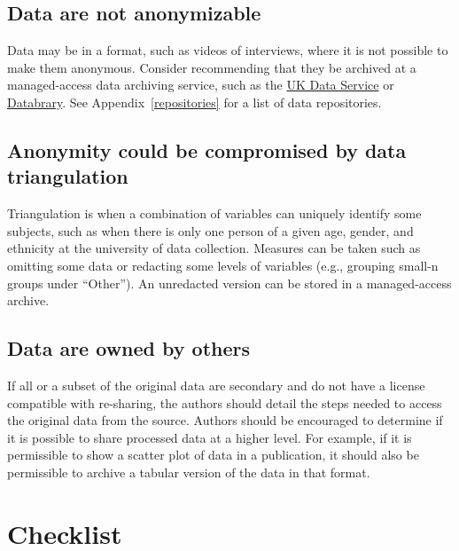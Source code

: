 \documentclass[
  oneside]{book}
\begin{document}
\hypertarget{data-are-not-anonymizable}{%
\subsection{Data are not anonymizable}\label{data-are-not-anonymizable}}

Data may be in a format, such as videos of interviews, where it is not possible to make them anonymous. Consider recommending that they be archived at a managed-access data archiving service, such as the \href{https://ukdataservice.ac.uk/deposit-data/}{UK Data Service} or \href{https://databrary.org/about/agreement.html}{Databrary}. See Appendix~\ref{repositories} for a list of data repositories.

\hypertarget{anonymity-could-be-compromised-by-data-triangulation}{%
\subsection{Anonymity could be compromised by data triangulation}\label{anonymity-could-be-compromised-by-data-triangulation}}

Triangulation is when a combination of variables can uniquely identify some subjects, such as when there is only one person of a given age, gender, and ethnicity at the university of data collection. Measures can be taken such as omitting some data or redacting some levels of variables (e.g., grouping small-n groups under ``Other''). An unredacted version can be stored in a managed-access archive.

\hypertarget{data-are-owned-by-others}{%
\subsection{Data are owned by others}\label{data-are-owned-by-others}}

If all or a subset of the original data are secondary and do not have a license compatible with re-sharing, the authors should detail the steps needed to access the original data from the source. Authors should be encouraged to determine if it is possible to share processed data at a higher level. For example, if it is permissible to show a scatter plot of data in a publication, it should also be permissible to archive a tabular version of the data in that format.

\hypertarget{checklist-2}{%
\section{Checklist}\label{checklist-2}}
\end{document}
